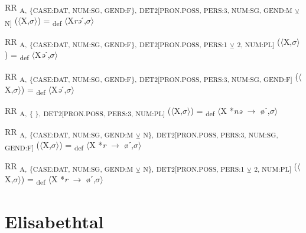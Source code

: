 {\begin{exe}
 RR \textsubscript{A,} \textsubscript{\{CASE:DAT, NUM:SG, GEND:F\},} \textsubscript{DET2[PRON.POSS, PERS:3, NUM:SG, GEND:M} \textsubscript{${\veebar}$}\textsubscript{ N]} ($\langle$X,$\sigma $$\rangle$) = \textsubscript{def} $\langle$X\textit{rə}ˊ,$\sigma $$\rangle$
\end{exe}

\begin{exe}
 RR \textsubscript{A,} \textsubscript{\{CASE:DAT, NUM:SG, GEND:F\},} \textsubscript{DET2[PRON.POSS, PERS:1} \textsubscript{${\veebar}$}\textsubscript{ 2, NUM:PL]} ($\langle$X,$\sigma $$\rangle$) = \textsubscript{def} $\langle$X\textit{ə}ˊ,$\sigma $$\rangle$
\end{exe}

\begin{exe}
 RR \textsubscript{A,} \textsubscript{\{CASE:DAT, NUM:SG, GEND:F\},} \textsubscript{DET2[PRON.POSS, PERS:3, NUM:SG, GEND:F]} ($\langle$X,$\sigma $$\rangle$) = \textsubscript{def} $\langle$X\textit{ə}ˊ,$\sigma $$\rangle$
\end{exe}

\begin{exe}
 RR \textsubscript{A,} \textsubscript{\{ \},} \textsubscript{DET2[PRON.POSS, PERS:3, NUM:PL]} ($\langle$X,$\sigma $$\rangle$) = \textsubscript{def} $\langle$X *\textit{nə} $\rightarrow$ øˊ,$\sigma $$\rangle$
\end{exe}

\begin{exe}
 RR \textsubscript{A,} \textsubscript{\{CASE:DAT, NUM:SG, GEND:M} \textsubscript{${\veebar}$}\textsubscript{ N\},} \textsubscript{DET2[PRON.POSS, PERS:3, NUM:SG, GEND:F]} ($\langle$X,$\sigma $$\rangle$) = \textsubscript{def} $\langle$X *\textit{r} $\rightarrow$ øˊ,$\sigma $$\rangle$
\end{exe}

\begin{exe}
 RR \textsubscript{A,} \textsubscript{\{CASE:DAT, NUM:SG, GEND:M} \textsubscript{${\veebar}$}\textsubscript{ N\},} \textsubscript{DET2[PRON.POSS, PERS:1} \textsubscript{${\veebar}$}\textsubscript{ 2, NUM:PL]} ($\langle$X,$\sigma $$\rangle$) = \textsubscript{def} $\langle$X *\textit{r} $\rightarrow$ øˊ,$\sigma $$\rangle$
\end{exe}

\section{Elisabethtal}

}
